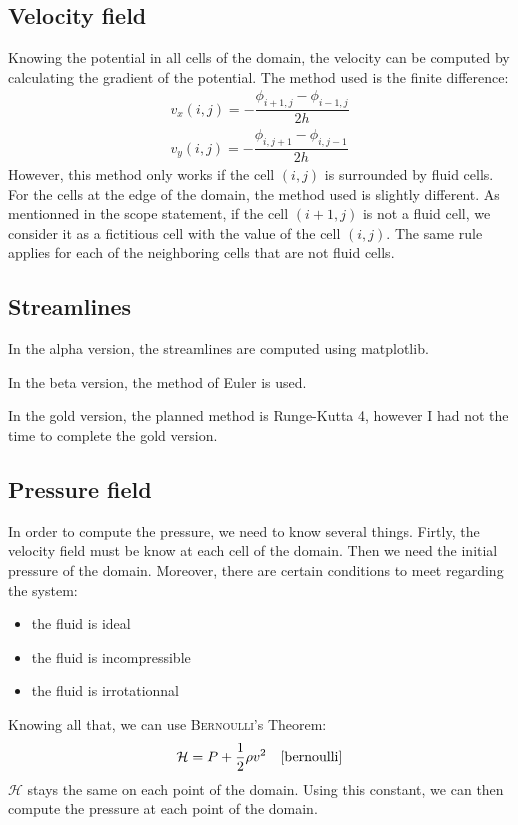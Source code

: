 \subsection{Velocity field}
Knowing the potential in all cells of the domain, the velocity can be computed
by calculating the gradient of the potential.
The method used is the finite difference:
\[
      \begin{array}{c}
            v_x(i, j) = - \dfrac{\phi_{i+1, j} - \phi_{i-1, j}}{2h}\\
            v_y(i, j) = - \dfrac{\phi_{i, j+1} - \phi_{i, j-1}}{2h}
      \end{array}
\]
However, this method only works if the cell $(i, j)$ is surrounded by fluid
cells. For the cells at the edge of the domain, the method used is slightly
different. As mentionned in the scope statement\cite{scope-statement}, if the
cell $(i+1, j)$ is not a fluid cell, we consider it as a fictitious cell with
the value of the cell $(i, j)$. The same rule applies for each of the
neighboring cells that are not fluid cells.

\subsection{Streamlines}
In the alpha version, the streamlines are computed using matplotlib.

In the beta version, the method of Euler is used.

In the gold version, the planned method is Runge-Kutta 4, however I had not the
time to complete the gold version.

\subsection{Pressure field}
In order to compute the pressure, we need to know several things. Firtly, the
velocity field must be know at each cell of the domain. Then we need the
initial pressure of the domain. Moreover, there are certain conditions to meet
regarding the system:

\begin{itemize}[noitemsep]
      \item the fluid is ideal
      \item the fluid is incompressible
      \item the fluid is irrotationnal
\end{itemize}
Knowing all that, we can use \textsc{Bernoulli}'s Theorem:
\[
      \mathcal{H} = P + \dfrac{1}{2} \rho v^2 \quad \text{\cite{bernoulli}}
\]
$\mathcal{H}$ stays the same on each point of the domain. Using this constant,
we can then compute the pressure at each point of the domain.


